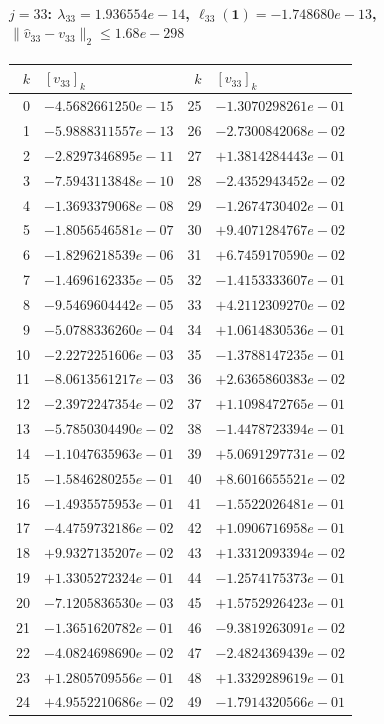 \paragraph{$j = 33$: $\lambda_{33} = 1.936554e-14$, \quad $\ell_{33}(\mathbf{1}) = -1.748680e-13$, \quad $\|\hat{v}_{33} - v_{33}\|_2 \leq 1.68e-298$}
\begin{center}
{\footnotesize
\begin{tabular}{r@{\;\;}l@{\quad}r@{\;\;}l}
\toprule
$k$ & $[v_{33}]_k$ & $k$ & $[v_{33}]_k$ \\
\midrule
0 & $-4.5682661250e-15$ & 25 & $-1.3070298261e-01$ \\
1 & $-5.9888311557e-13$ & 26 & $-2.7300842068e-02$ \\
2 & $-2.8297346895e-11$ & 27 & $+1.3814284443e-01$ \\
3 & $-7.5943113848e-10$ & 28 & $-2.4352943452e-02$ \\
4 & $-1.3693379068e-08$ & 29 & $-1.2674730402e-01$ \\
5 & $-1.8056546581e-07$ & 30 & $+9.4071284767e-02$ \\
6 & $-1.8296218539e-06$ & 31 & $+6.7459170590e-02$ \\
7 & $-1.4696162335e-05$ & 32 & $-1.4153333607e-01$ \\
8 & $-9.5469604442e-05$ & 33 & $+4.2112309270e-02$ \\
9 & $-5.0788336260e-04$ & 34 & $+1.0614830536e-01$ \\
10 & $-2.2272251606e-03$ & 35 & $-1.3788147235e-01$ \\
11 & $-8.0613561217e-03$ & 36 & $+2.6365860383e-02$ \\
12 & $-2.3972247354e-02$ & 37 & $+1.1098472765e-01$ \\
13 & $-5.7850304490e-02$ & 38 & $-1.4478723394e-01$ \\
14 & $-1.1047635963e-01$ & 39 & $+5.0691297731e-02$ \\
15 & $-1.5846280255e-01$ & 40 & $+8.6016655521e-02$ \\
16 & $-1.4935575953e-01$ & 41 & $-1.5522026481e-01$ \\
17 & $-4.4759732186e-02$ & 42 & $+1.0906716958e-01$ \\
18 & $+9.9327135207e-02$ & 43 & $+1.3312093394e-02$ \\
19 & $+1.3305272324e-01$ & 44 & $-1.2574175373e-01$ \\
20 & $-7.1205836530e-03$ & 45 & $+1.5752926423e-01$ \\
21 & $-1.3651620782e-01$ & 46 & $-9.3819263091e-02$ \\
22 & $-4.0824698690e-02$ & 47 & $-2.4824369439e-02$ \\
23 & $+1.2805709556e-01$ & 48 & $+1.3329289619e-01$ \\
24 & $+4.9552210686e-02$ & 49 & $-1.7914320566e-01$ \\
\bottomrule
\end{tabular}
}
\end{center}

